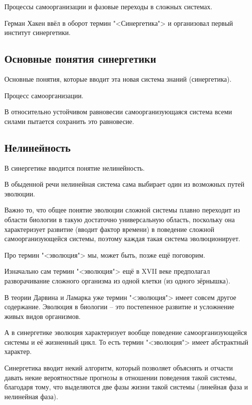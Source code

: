 \documentclass[main.tex]{subfiles}
\begin{document}
Процессы самоорганизации и фазовые переходы в сложных системах.

Герман Хакен ввёл в оборот термин "<Синергетика"> и организовал первый институт синергетики.

\subsection{Основные понятия синергетики}


Основные понятия, которые вводит эта новая система знаний (синергетика).

Процесс самоорганизации.

В относительно устойчивом равновесии самоорганизующаяся система всеми силами пытается сохранить это равновесие.

\subsection{Нелинейность}


В синергетике вводится понятие нелинейность.

В обыденной речи нелинейная система сама выбирает один из возможных путей эволюции.

Важно то, что общее понятие эволюции сложной системы плавно переходит из области биологии в такую достаточно универсальную область, поскольку она характеризует развитие (вводит фактор времени) в поведение сложной самоорганизующейся системы, поэтому каждая такая система эволюционирует.

Про термин "<эволюция"> мы, может быть, позже ещё поговорим.

Изначально сам термин "<эволюция"> ещё в XVII веке предполагал разворачивание сложного организма из одной клетки (из одного зёрнышка).

В теории Дарвина и Ламарка уже термин "<эволюция"> имеет совсем другое содержание.
Эволюция в биологии -- это постепенное развитие и усложнение живых видов организмов.

А в синергетике эволюция характеризует вообще поведение самоорганизующейся системы и её жизненный цикл.
То есть термин "<эволюция"> имеет абстрактный характер.


Синергетика вводит некий алгоритм, который позволяет объяснять и отчасти давать некие вероятностные прогнозы в отношении поведения такой системы, благодаря тому, что выделяются две фазы жизни такой системы (линейная фаза и нелинейная фаза).
\end{document}
